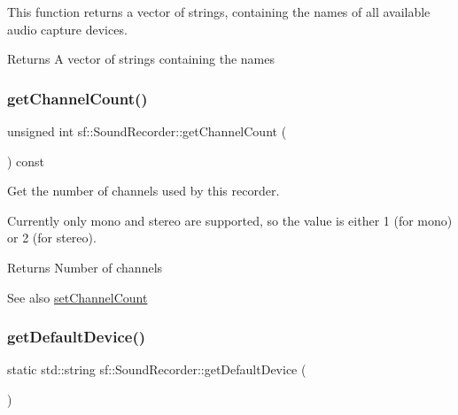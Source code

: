 This function returns a vector of strings, containing the names of all available audio capture devices.

\begin{DoxyReturn}{Returns}
A vector of strings containing the names \begin{DoxyVerb}\end{DoxyVerb}
 
\end{DoxyReturn}
\mbox{\label{classsf_1_1_sound_recorder_a610e98e7a73b316ce26b7c55234f86e9}} 
\subsubsection{\texorpdfstring{getChannelCount()}{getChannelCount()}}
{\footnotesize\ttfamily unsigned int sf\+::\+Sound\+Recorder\+::get\+Channel\+Count (\begin{DoxyParamCaption}{ }\end{DoxyParamCaption}) const}



Get the number of channels used by this recorder. 

Currently only mono and stereo are supported, so the value is either 1 (for mono) or 2 (for stereo).

\begin{DoxyReturn}{Returns}
Number of channels
\end{DoxyReturn}
\begin{DoxySeeAlso}{See also}
\mbox{\hyperlink{classsf_1_1_sound_recorder_ae4e22ba67d12a74966eb05fad55a317c}{set\+Channel\+Count}} \begin{DoxyVerb}\end{DoxyVerb}
 
\end{DoxySeeAlso}
\mbox{\label{classsf_1_1_sound_recorder_ad1d450a80642dab4b632999d72a1bf23}} 
\subsubsection{\texorpdfstring{getDefaultDevice()}{getDefaultDevice()}}
{\footnotesize\ttfamily static std\+::string sf\+::\+Sound\+Recorder\+::get\+Default\+Device (\begin{DoxyParamCaption}{ }\end{DoxyParamCaption})\hspace{0.3cm}{\ttfamily [static]}}



